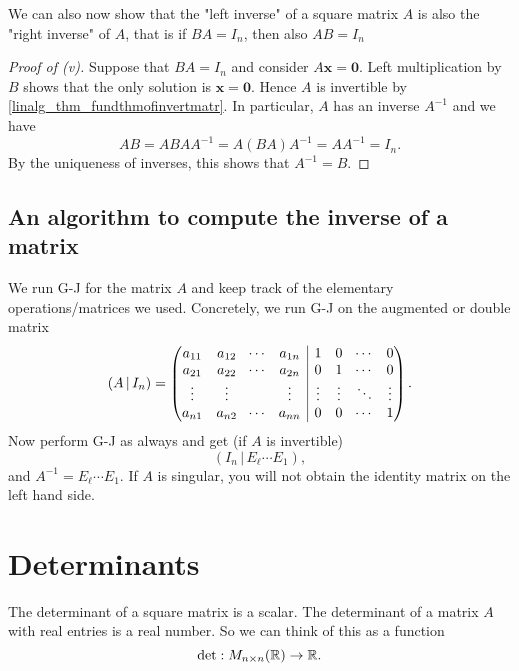 \documentclass[10pt, a4paper]{article}
\newcommand{\mbf}[1]{\mathbf{#1}}
\begin{document}
\begin{remark}
    We can also now show that the "left inverse" of a square matrix $A$ is also the "right inverse" of $A$,
    that is if $BA = I_n$, then also $AB = I_n$
\end{remark}

\begin{proposition}[continues = prop:propofinvandtransp]
    \begin{proof}[Proof of (v)]
        Suppose that $BA = I_n$ and consider $A\mbf{x} = \mbf{0}$.
        Left multiplication by $B$ shows that the only solution is $\mbf{x} = \mbf{0}$.
        Hence $A$ is invertible by \autoref{linalg_thm_fundthmofinvertmatr}.
        In particular, $A$ has an inverse $A ^ {-1}$ and we have
        \[
        AB = ABAA ^ {-1} = A(BA)A ^ {-1} = AA ^ {-1} = I_n.
        \]
        By the uniqueness of inverses, this shows that $A ^ {-1} = B$.
    \end{proof}
\end{proposition}

\subsection{An algorithm to compute the inverse of a matrix}
We run G-J for the matrix $A$ and keep track of the elementary operations/matrices we used.
Concretely, we run G-J on the augmented or double matrix
\[
(A \,|\, I_n) =
\left(\hspace{-5pt}
\begin{array}{cccc|cccc}
     a_{1 1} & a_{1 2} & \dotsi & a_{1 n} & 1 & 0 & \dotsi & 0 \\
     a_{2 1} & a_{2 2} & \dotsi & a_{2 n} & 0 & 1 & \dotsi & 0 \\
     \vdots & \vdots & \phantom{} & \vdots & \vdots & \vdots & \ddots & \vdots \\
     a_{n 1} & a_{n 2} & \dotsi & a_{n n} & 0 & 0 & \dotsi & 1
\end{array}
\hspace{-5pt}\right).
\]
Now perform G-J as always and get (if $A$ is invertible)
\[
(I_n\,|\,E_\ell \dotsi E_1),
\]
and $A ^ {-1} = E_\ell \dotsi E_1$.
If $A$ is singular,
you will not obtain the identity matrix on the left hand side.

\newpage

\section{Determinants}
The determinant of a square matrix is a scalar.
The determinant of a matrix $A$ with real entries is a real number.
So we can think of this as a function
\[
\det : M_{n \times n}(\mathbb{R}) \rightarrow \mathbb{R}.
\]
\end{document}
